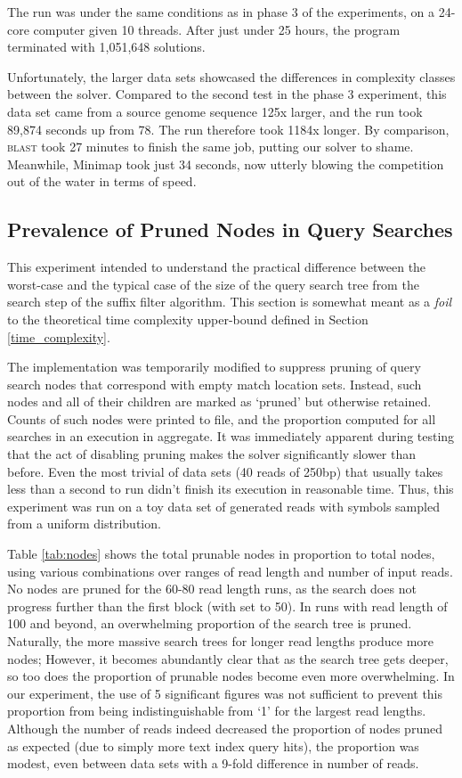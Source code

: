 The run was under the same conditions as in phase 3 of the experiments, on a 24-core computer given 10 threads. After just under 25 hours, the program terminated with 1,051,648 solutions.

Unfortunately, the larger data sets showcased the differences in complexity classes between the solver. Compared to the second test in the phase 3 experiment, this data set came from a \gls{source genome} sequence 125x larger, and the run took 89,874 seconds up from 78. The run therefore took 1184x longer. By comparison, \textsc{blast} took 27 minutes to finish the same job, putting our \aspop{} solver to shame. Meanwhile, Minimap took just 34 seconds, now utterly blowing the competition out of the water in terms of speed.


\subsection{Prevalence of Pruned Nodes in Query Searches}
\label{aux:nodes}

This experiment intended to understand the practical difference between the worst-case and the typical case of the size of the \gls{query} search tree from the \gls{search step} of the \gls{suffix filter} algorithm. This section is somewhat meant as a \textit{foil} to the theoretical time complexity upper-bound defined in Section \ref{time_complexity}.

The implementation was temporarily modified to suppress pruning of \gls{query} search nodes that correspond with empty \gls{match location} sets. Instead, such nodes and all of their children are marked as `pruned' but otherwise retained. Counts of such nodes were printed to file, and the proportion computed for all searches in an execution in aggregate. It was immediately apparent during testing that the act of disabling pruning makes the solver significantly slower than before. Even the most trivial of data sets (40 \glspl{read} of 250bp) that usually takes less than a second to run didn't finish its execution in reasonable time. Thus, this experiment was run on a toy data set of generated reads with symbols sampled from a uniform distribution.

Table \ref{tab:nodes} shows the total prunable nodes in proportion to total nodes, using various combinations over ranges of \gls{read} length and number of input reads. No nodes are pruned for the 60-80 read length runs, as the search does not progress further than the first \gls{block} (with  set to 50). In runs with read length of 100 and beyond, an overwhelming proportion of the search tree is pruned. Naturally, the more massive search trees for longer read lengths produce more nodes; However, it becomes abundantly clear that as the search tree gets deeper, so too does the proportion of prunable nodes become even more overwhelming. In our experiment, the use of 5 significant figures was not sufficient to prevent this proportion from being indistinguishable from `1' for the largest read lengths. Although the number of reads indeed decreased the proportion of nodes pruned as expected (due to simply more \gls{text index} query hits), the proportion was modest, even between data sets with a 9-fold difference in number of reads.

